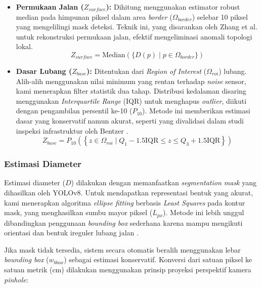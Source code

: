 \documentclass{iopjournal}
\begin{document}
\begin{itemize}
    \item \textbf{Permukaan Jalan ($Z_{surface}$):} Dihitung menggunakan estimator robust median pada himpunan piksel dalam area \textit{border} ($\Omega_{border}$) selebar 10 piksel yang mengelilingi mask deteksi. Teknik ini, yang disarankan oleh Zhang et al. \cite{zhang2020} untuk rekonstruksi permukaan jalan, efektif mengeliminasi anomali topologi lokal.
    \begin{equation}
    Z_{surface} = \text{Median}(\{D(p) \mid p \in \Omega_{border}\})
    \end{equation}
    
    \item \textbf{Dasar Lubang ($Z_{base}$):} Ditentukan dari \textit{Region of Interest} ($\Omega_{roi}$) lubang. Alih-alih menggunakan nilai minimum yang rentan terhadap \textit{noise} sensor, kami menerapkan filter statistik dua tahap. Distribusi kedalaman disaring menggunakan \textit{Interquartile Range} (IQR) untuk menghapus \textit{outlier}, diikuti dengan pengambilan persentil ke-10 ($P_{10}$). Metode ini memberikan estimasi dasar yang konservatif namun akurat, seperti yang divalidasi dalam studi inspeksi infrastruktur oleh Bentzer \cite{bentzer2025}.
    \begin{equation}
    Z_{base} = P_{10}\left(\left\{z \in \Omega_{roi} \mid Q_1 - 1.5\text{IQR} \leq z \leq Q_3 + 1.5\text{IQR}\right\}\right)
    \end{equation}
\end{itemize}

\subsubsection{Estimasi Diameter}
Estimasi diameter ($D$) dilakukan dengan memanfaatkan \textit{segmentation mask} yang dihasilkan oleh YOLOv8. Untuk mendapatkan representasi bentuk yang akurat, kami menerapkan algoritma \textit{ellipse fitting} berbasis \textit{Least Squares} pada kontur mask, yang menghasilkan sumbu mayor piksel ($L_{px}$). Metode ini lebih unggul dibandingkan penggunaan \textit{bounding box} sederhana karena mampu mengikuti orientasi dan bentuk ireguler lubang jalan \cite{singh2021}.

Jika mask tidak tersedia, sistem secara otomatis beralih menggunakan lebar \textit{bounding box} ($w_{bbox}$) sebagai estimasi konservatif. Konversi dari satuan piksel ke satuan metrik (cm) dilakukan menggunakan prinsip proyeksi perspektif kamera \textit{pinhole}:
\end{document}

